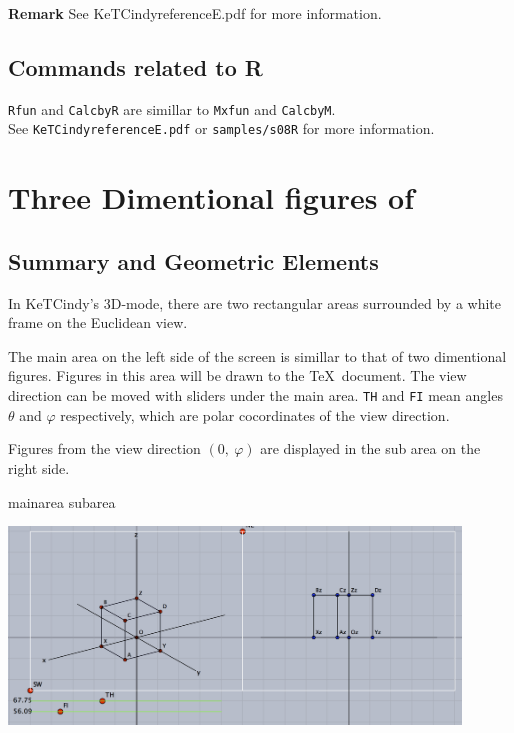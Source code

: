 \documentclass[papersize,a4paper,12pt]{article}
\begin{document}
\noindent
{\bf Remark} See KeTCindyreferenceE.pdf for more information.

\subsection{Commands related to R}

\verb|Rfun| and \verb|CalcbyR| are simillar to \verb|Mxfun| and \verb|CalcbyM|.\\
 See \verb|KeTCindyreferenceE.pdf| or \verb|samples/s08R| for more information.


\newpage

\section{Three Dimentional figures of \ketcindy}

\subsection{Summary and Geometric Elements}

In KeTCindy's 3D-mode, there are two rectangular areas surrounded by a white frame on the Euclidean view.

The main area on the left side of the screen is simillar to that of two dimentional figures. Figures in this area will be drawn to the \TeX\ document. The view direction can be moved with sliders under the main area.  \verb|TH| and \verb|FI| mean angles $\theta$ and $\varphi$ respectively, which are polar cocordinates of the view direction.

Figures from the view direction $(0,\ \varphi)$ are displayed in the sub area on the right side.

 \hspace{40mm} mainarea \hspace{40mm} subarea
\begin{center}
\includegraphics[bb=0.00 0.00 863.04 378.52,width=12cm]{Fig/3dscreen.pdf}
\end{center}
\end{document}
